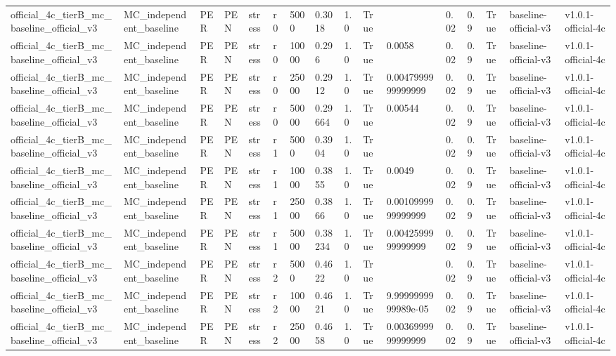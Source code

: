 \begin{table}[!htbp]
\begin{tabular}{llllllllllllllll}
official\_4c\_tierB\_mc\_baseline\_official\_v3 & MC\_independent\_baseline & PER & PEN & stress & r0 & 5000 & 0.3018 & 1.0 & True &  & 0.02 & 0.9 & True & baseline-official-v3 & v1.0.1-official-4c \\
official\_4c\_tierB\_mc\_baseline\_official\_v3 & MC\_independent\_baseline & PER & PEN & stress & r0 & 10000 & 0.296 & 1.0 & True & 0.0058 & 0.02 & 0.9 & True & baseline-official-v3 & v1.0.1-official-4c \\
official\_4c\_tierB\_mc\_baseline\_official\_v3 & MC\_independent\_baseline & PER & PEN & stress & r0 & 25000 & 0.2912 & 1.0 & True & 0.0047999999999999 & 0.02 & 0.9 & True & baseline-official-v3 & v1.0.1-official-4c \\
official\_4c\_tierB\_mc\_baseline\_official\_v3 & MC\_independent\_baseline & PER & PEN & stress & r0 & 50000 & 0.29664 & 1.0 & True & 0.00544 & 0.02 & 0.9 & True & baseline-official-v3 & v1.0.1-official-4c \\
official\_4c\_tierB\_mc\_baseline\_official\_v3 & MC\_independent\_baseline & PER & PEN & stress & r1 & 5000 & 0.3904 & 1.0 & True &  & 0.02 & 0.9 & True & baseline-official-v3 & v1.0.1-official-4c \\
official\_4c\_tierB\_mc\_baseline\_official\_v3 & MC\_independent\_baseline & PER & PEN & stress & r1 & 10000 & 0.3855 & 1.0 & True & 0.0049 & 0.02 & 0.9 & True & baseline-official-v3 & v1.0.1-official-4c \\
official\_4c\_tierB\_mc\_baseline\_official\_v3 & MC\_independent\_baseline & PER & PEN & stress & r1 & 25000 & 0.3866 & 1.0 & True & 0.0010999999999999 & 0.02 & 0.9 & True & baseline-official-v3 & v1.0.1-official-4c \\
official\_4c\_tierB\_mc\_baseline\_official\_v3 & MC\_independent\_baseline & PER & PEN & stress & r1 & 50000 & 0.38234 & 1.0 & True & 0.0042599999999999 & 0.02 & 0.9 & True & baseline-official-v3 & v1.0.1-official-4c \\
official\_4c\_tierB\_mc\_baseline\_official\_v3 & MC\_independent\_baseline & PER & PEN & stress & r2 & 5000 & 0.4622 & 1.0 & True &  & 0.02 & 0.9 & True & baseline-official-v3 & v1.0.1-official-4c \\
official\_4c\_tierB\_mc\_baseline\_official\_v3 & MC\_independent\_baseline & PER & PEN & stress & r2 & 10000 & 0.4621 & 1.0 & True & 9.9999999999989e-05 & 0.02 & 0.9 & True & baseline-official-v3 & v1.0.1-official-4c \\
official\_4c\_tierB\_mc\_baseline\_official\_v3 & MC\_independent\_baseline & PER & PEN & stress & r2 & 25000 & 0.4658 & 1.0 & True & 0.0036999999999999 & 0.02 & 0.9 & True & baseline-official-v3 & v1.0.1-official-4c \\

\end{tabular}
\end{table}
